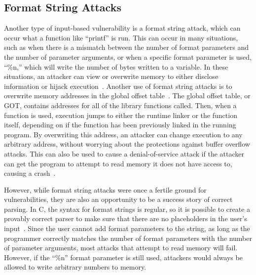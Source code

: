 \subsection{Format String Attacks}
\label{sec:formatStringAttacks}
Another type of input-based vulnerability is a format string attack, which can occur what a function like ``printf'' is run.  This can occur in many situations, such as when there is a mismatch between the number of format parameters and the number of parameter arguments, or when a specific format parameter is used, ``\%n,'' which will write the number of bytes written to a variable.  In these situations, an attacker can view or overwrite memory to either disclose information or hijack execution~\cite{newsham_2000}.  Another use of format string attacks is to overwrite memory addresses in the global offset table~\cite{scut2001exploiting}.  The global offset table, or GOT, contains addresses for all of the library functions called.  Then, when a function is used, execution jumps to either the runtime linker or the function itself, depending on if the function has been previously linked in the running program.  By overwriting this address, an attacker can change execution to any arbitrary address, without worrying about the protections against buffer overflow attacks.  This can also be used to cause a denial-of-service attack if the attacker can get the program to attempt to read memory it does not have access to, causing a crash~\cite{scut2001exploiting}.

However, while format string attacks were once a fertile ground for vulnerabilities, they are also an opportunity to be a success story of correct parsing.  In C, the syntax for format strings is regular, so it is possible to create a provably correct parser to make sure that there are no  placeholders in the user's input~\cite{sassaman2013security}.  Since the user cannot add format parameters to the string, as long as the programmer correctly matches the number of format parameters with the number of parameter arguments, most attacks that attempt to read memory will fail.  However, if the ``\%n'' format parameter is still used, attackers would always be allowed to write arbitrary numbers to memory.

